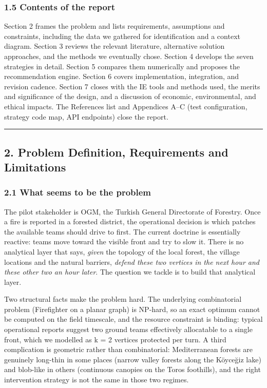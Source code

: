 \documentclass[
  11pt,
]{article}
\begin{document}
\subsubsection{1.5 Contents of the report}\label{contents-of-the-report}

Section 2 frames the problem and lists requirements, assumptions and
constraints, including the data we gathered for identification and a
context diagram. Section 3 reviews the relevant literature, alternative
solution approaches, and the methods we eventually chose. Section 4
develops the seven strategies in detail. Section 5 compares them
numerically and proposes the recommendation engine. Section 6 covers
implementation, integration, and revision cadence. Section 7 closes with
the IE tools and methods used, the merits and significance of the
design, and a discussion of economic, environmental, and ethical
impacts. The References list and Appendices A--C (test configuration,
strategy code map, API endpoints) close the report.

\begin{center}\rule{0.5\linewidth}{0.5pt}\end{center}

\subsection{2. Problem Definition, Requirements and
Limitations}\label{problem-definition-requirements-and-limitations}

\subsubsection{2.1 What seems to be the
problem}\label{what-seems-to-be-the-problem}

The pilot stakeholder is OGM, the Turkish General Directorate of
Forestry. Once a fire is reported in a forested district, the
operational decision is which patches the available teams should drive
to first. The current doctrine is essentially reactive: teams move
toward the visible front and try to slow it. There is no analytical
layer that says, \emph{given} the topology of the local forest, the
village locations and the natural barriers, \emph{defend these two
vertices in the next hour and these other two an hour later}. The
question we tackle is to build that analytical layer.

Two structural facts make the problem hard. The underlying combinatorial
problem (Firefighter on a planar graph) is NP-hard, so an exact optimum
cannot be computed on the field timescale, and the resource constraint
is binding: typical operational reports suggest two ground teams
effectively allocatable to a single front, which we modelled as k = 2
vertices protected per turn. A third complication is geometric rather
than combinatorial: Mediterranean forests are genuinely long-thin in
some places (narrow valley forests along the Köyceğiz lake) and
blob-like in others (continuous canopies on the Toros foothills), and
the right intervention strategy is not the same in those two regimes.
\end{document}
